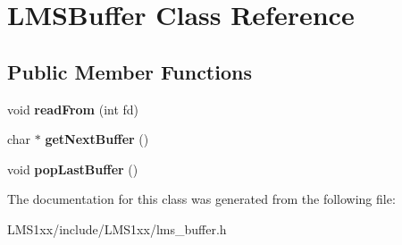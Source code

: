 \hypertarget{classLMSBuffer}{}\section{L\+M\+S\+Buffer Class Reference}
\label{classLMSBuffer}
\subsection*{Public Member Functions}
\begin{DoxyCompactItemize}
\item 
\mbox{\label{classLMSBuffer_a8810f770a351d3134c9af38a60874da1}} 
void {\bfseries read\+From} (int fd)
\item 
\mbox{\label{classLMSBuffer_af5d86deafa711048b0ef71ecf3fdf6eb}} 
char $\ast$ {\bfseries get\+Next\+Buffer} ()
\item 
\mbox{\label{classLMSBuffer_a2b8a81a50ac686e507ef9191d48a04d9}} 
void {\bfseries pop\+Last\+Buffer} ()
\end{DoxyCompactItemize}


The documentation for this class was generated from the following file\+:\begin{DoxyCompactItemize}
\item 
L\+M\+S1xx/include/\+L\+M\+S1xx/lms\+\_\+buffer.\+h\end{DoxyCompactItemize}
